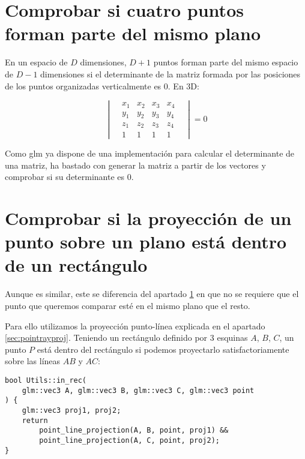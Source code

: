 \section{Comprobar si cuatro puntos forman parte del mismo plano}
\label{sec:check4pointplane}
En un espacio de $D$ dimensiones, $D+1$ puntos forman parte del mismo espacio de $D-1$ dimensiones si el determinante de la matriz formada por las posiciones de los puntos organizadas verticalmente es 0. En 3D:

\[
\begin{vmatrix}
& x_1 & x_2 & x_3 & x_4 &\\ 
& y_1 & y_2 & y_3 & y_4 &\\ 
& z_1 & z_2 & z_3 & z_4 &\\ 
& 1   & 1   & 1   & 1   &
\end{vmatrix} = 0
\]

Como glm ya dispone de una implementación para calcular el determinante de una matriz, ha bastado con generar la matriz a partir de los vectores y comprobar si su determinante es 0.

\section{Comprobar si la proyección de un punto sobre un plano está dentro de un rectángulo}
Aunque es similar, este se diferencia del apartado \ref{sec:check4pointplane} en que no se requiere que el punto que queremos comparar esté en el mismo plano que el resto.

Para ello utilizamos la proyección punto-línea explicada en el apartado \ref{sec:pointrayproj}. Teniendo un rectángulo definido por 3 esquinas $A$, $B$, $C$, un punto $P$ está dentro del rectángulo si podemos proyectarlo satisfactoriamente sobre las líneas $AB$ y $AC$:

\begin{lstlisting}
bool Utils::in_rec(
    glm::vec3 A, glm::vec3 B, glm::vec3 C, glm::vec3 point
) {
	glm::vec3 proj1, proj2;
	return 
		point_line_projection(A, B, point, proj1) && 
		point_line_projection(A, C, point, proj2);
}
\end{lstlisting}
